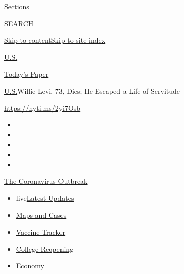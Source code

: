 Sections

SEARCH

\protect\hyperlink{site-content}{Skip to
content}\protect\hyperlink{site-index}{Skip to site index}

\href{https://www.nytimes3xbfgragh.onion/section/us}{U.S.}

\href{https://myaccount.nytimes3xbfgragh.onion/auth/login?response_type=cookie\&client_id=vi}{}

\href{https://www.nytimes3xbfgragh.onion/section/todayspaper}{Today's
Paper}

\href{/section/us}{U.S.}\textbar{}Willie Levi, 73, Dies; He Escaped a
Life of Servitude

\url{https://nyti.ms/2yi7Osb}

\begin{itemize}
\item
\item
\item
\item
\item
\end{itemize}

\href{https://www.nytimes3xbfgragh.onion/news-event/coronavirus?action=click\&pgtype=Article\&state=default\&region=TOP_BANNER\&context=storylines_menu}{The
Coronavirus Outbreak}

\begin{itemize}
\tightlist
\item
  live\href{https://www.nytimes3xbfgragh.onion/2020/08/04/world/coronavirus-covid-19.html?action=click\&pgtype=Article\&state=default\&region=TOP_BANNER\&context=storylines_menu}{Latest
  Updates}
\item
  \href{https://www.nytimes3xbfgragh.onion/interactive/2020/us/coronavirus-us-cases.html?action=click\&pgtype=Article\&state=default\&region=TOP_BANNER\&context=storylines_menu}{Maps
  and Cases}
\item
  \href{https://www.nytimes3xbfgragh.onion/interactive/2020/science/coronavirus-vaccine-tracker.html?action=click\&pgtype=Article\&state=default\&region=TOP_BANNER\&context=storylines_menu}{Vaccine
  Tracker}
\item
  \href{https://www.nytimes3xbfgragh.onion/2020/08/02/us/covid-college-reopening.html?action=click\&pgtype=Article\&state=default\&region=TOP_BANNER\&context=storylines_menu}{College
  Reopening}
\item
  \href{https://www.nytimes3xbfgragh.onion/live/2020/08/03/business/stock-market-today-coronavirus?action=click\&pgtype=Article\&state=default\&region=TOP_BANNER\&context=storylines_menu}{Economy}
\end{itemize}

